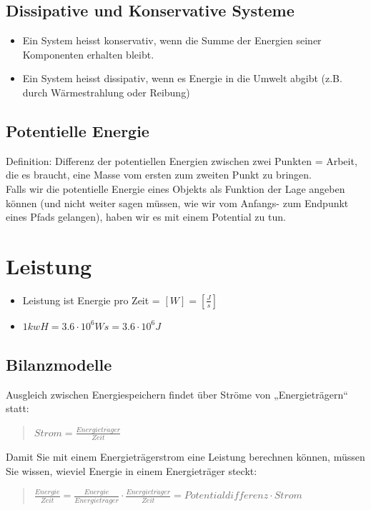 \subsection*{Dissipative und Konservative Systeme}
\begin{itemize}
\item Ein System heisst konservativ, wenn die Summe der Energien seiner
Komponenten erhalten bleibt.
\item Ein System heisst dissipativ, wenn es Energie in die Umwelt abgibt
(z.B. durch Wärmestrahlung oder Reibung)
\end{itemize}

\subsection*{Potentielle Energie}

Definition: Differenz der potentiellen Energien zwischen zwei Punkten
= Arbeit, die es braucht, eine Masse vom ersten zum zweiten Punkt
zu bringen.\\
Falls wir die potentielle Energie eines Objekts als Funktion der Lage
angeben können (und nicht weiter sagen müssen, wie wir vom Anfangs-
zum Endpunkt eines Pfads gelangen), haben wir es mit einem Potential
zu tun.


\section*{Leistung}
\begin{itemize}
\item Leistung ist Energie pro Zeit = $\left[W\right]=\left[\frac{J}{s}\right]$
\item $1kwH=3.6\cdot10^{6}Ws=3.6\cdot10^{6}J$
\end{itemize}

\subsection*{Bilanzmodelle}

Ausgleich zwischen Energiespeichern findet über Ströme von „Energieträgern“
statt:
\begin{verse}
$Strom=\frac{Energietr\ddot{a}ger}{Zeit}$
\end{verse}
Damit Sie mit einem Energieträgerstrom eine Leistung berechnen können,
müssen Sie wissen, wieviel Energie in einem Energieträger steckt:
\begin{verse}
$\frac{Energie}{Zeit}=\frac{Energie}{Energietr\ddot{a}ger}\cdot\frac{Energietr\ddot{a}ger}{Zeit}=Potentialdifferenz\cdot Strom$
\end{verse}

